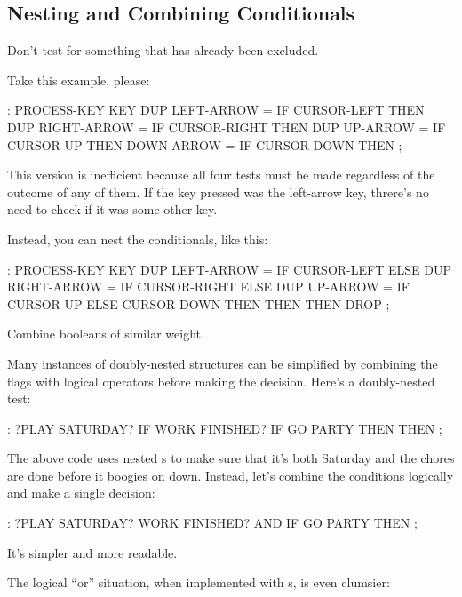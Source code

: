 \subsection{Nesting and Combining Conditionals}%
%
\begin{tip}
Don't test for something that has already been excluded.
\end{tip}
Take this example, please:

\begin{Code}
: PROCESS-KEY
   KEY  DUP  LEFT-ARROW  =  IF CURSOR-LEFT  THEN
        DUP  RIGHT-ARROW =  IF CURSOR-RIGHT THEN
        DUP  UP-ARROW    =  IF CURSOR-UP    THEN
             DOWN-ARROW  =  IF CURSOR-DOWN  THEN ;
\end{Code}
This version is inefficient because all four tests must be made regardless
of the outcome of any of them. If the key pressed was the left-arrow key,
threre's no need to check if it was some other key.

Instead, you can nest the conditionals, like this:

\begin{Code}
: PROCESS-KEY
   KEY  DUP  LEFT-ARROW  =  IF CURSOR-LEFT  ELSE
        DUP  RIGHT-ARROW =  IF CURSOR-RIGHT ELSE
        DUP  UP-ARROW    =  IF CURSOR-UP    ELSE
                               CURSOR-DOWN
           THEN THEN THEN  DROP ;
\end{Code}
\begin{tip}
Combine booleans of similar weight.
\end{tip}
Many instances of doubly-nested  structures can be simplified
by combining the flags with logical operators before making the decision.
Here's a doubly-nested test:

\begin{Code}
: ?PLAY   SATURDAY? IF  WORK FINISHED? IF
     GO PARTY  THEN  THEN ;
\end{Code}
The above code uses nested s to make sure that it's both
Saturday and the chores are done before it boogies on down. Instead,
let's combine the conditions logically and make a single decision:

\begin{Code}
: ?PLAY   SATURDAY?  WORK FINISHED? AND  IF
   GO PARTY  THEN ;
\end{Code}
It's simpler and more readable.

The logical ``or'' situation, when implemented with s, is
even clumsier:

